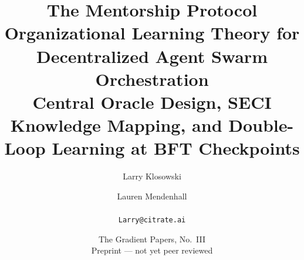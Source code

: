 
\title{\textbf{The Mentorship Protocol}\\[3pt]
\large Organizational Learning Theory for Decentralized Agent Swarm Orchestration\\[2pt]
\normalsize Central Oracle Design, SECI Knowledge Mapping, and Double-Loop Learning at BFT Checkpoints}
\author{Larry Klosowski \and Lauren Mendenhall\\[2pt]\CitrateAffil\\ \texttt{Larry@citrate.ai}}
\date{The Gradient Papers, No.~III \\ Preprint --- not yet peer reviewed}
\maketitle
